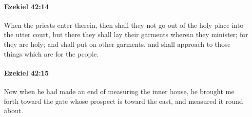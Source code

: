 		\paragraph{Ezekiel 42:14} %
			\label{EZEKIEL-42-14}

			When the priests enter therein, then shall they not go out of the holy place into the utter court, but there they shall lay their garments wherein they minister; for they are holy; and shall put on other garments, and shall approach to those things which are for the people.


		\paragraph{Ezekiel 42:15} %
			\label{EZEKIEL-42-15}

			Now when he had made an end of measuring the inner house, he brought me forth toward the gate whose prospect is toward the east, and measured it round about.

